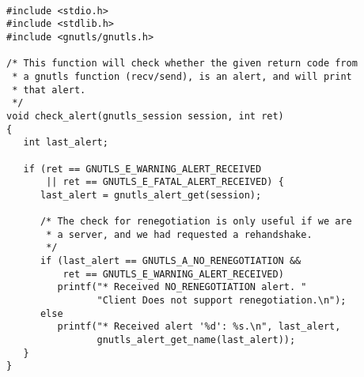 \begin{verbatim}

#include <stdio.h>
#include <stdlib.h>
#include <gnutls/gnutls.h>

/* This function will check whether the given return code from
 * a gnutls function (recv/send), is an alert, and will print
 * that alert.
 */
void check_alert(gnutls_session session, int ret)
{
   int last_alert;

   if (ret == GNUTLS_E_WARNING_ALERT_RECEIVED
       || ret == GNUTLS_E_FATAL_ALERT_RECEIVED) {
      last_alert = gnutls_alert_get(session);

      /* The check for renegotiation is only useful if we are 
       * a server, and we had requested a rehandshake.
       */
      if (last_alert == GNUTLS_A_NO_RENEGOTIATION &&
          ret == GNUTLS_E_WARNING_ALERT_RECEIVED)
         printf("* Received NO_RENEGOTIATION alert. "
                "Client Does not support renegotiation.\n");
      else
         printf("* Received alert '%d': %s.\n", last_alert,
                gnutls_alert_get_name(last_alert));
   }
}

\end{verbatim}
